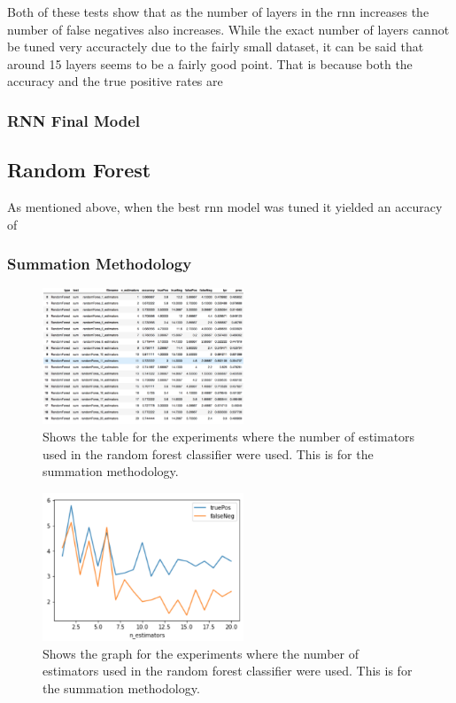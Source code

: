 \documentclass[twoside,twocolumn]{article}
\begin{document}
Both of these tests show that as the number of layers in the rnn increases the number of false
negatives also increases. While the exact number of layers cannot be tuned very accuractely
due to the fairly small dataset, it can be said that around 15 layers seems to be a fairly good point. 
That is because both the accuracy and the true positive rates are 


\subsubsection{RNN Final Model}





\subsection{Random Forest}

As mentioned above, when the best rnn model was tuned it yielded an accuracy of 


\subsubsection{Summation Methodology}

\begin{figure}[H]
\includegraphics[width=6cm]{randForest_estimators_summed_table}
\centering
\caption{Shows the table for the experiments where the number of estimators used
in the random forest classifier were used. This is for the summation methodology.}
\end{figure}

\begin{figure}[H]
\includegraphics[width=6cm]{randForest_estimators_summed_graph}
\centering
\caption{Shows the graph for the experiments where the number of estimators used
in the random forest classifier were used. This is for the summation methodology.}
\end{figure}
\end{document}
